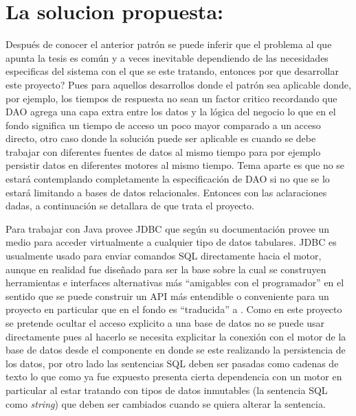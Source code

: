 \section{La solucion propuesta: \jj}
Después de conocer el anterior patrón se puede inferir que el problema al que apunta la tesis es común y a veces inevitable dependiendo de las necesidades especificas del sistema con el que se este tratando, entonces por que desarrollar este proyecto? Pues para aquellos desarrollos donde el patrón sea aplicable donde, por ejemplo, los tiempos de respuesta no sean un factor critico recordando que DAO agrega una capa extra entre los datos y la lógica del negocio lo que en el fondo significa un tiempo de acceso un poco mayor comparado a un acceso directo, otro caso donde la solución puede ser aplicable es cuando se debe trabajar con diferentes fuentes de datos al mismo tiempo para por ejemplo persistir datos en diferentes motores al mismo tiempo. Tema aparte es que no se estará contemplando completamente la especificación de DAO si no que se lo estará limitando a bases de datos relacionales. Entonces con las aclaraciones dadas, a continuación se detallara de que trata el proyecto.

Para trabajar con \dd Java provee JDBC\cite{java:jdbc} que según su documentación provee un medio para acceder virtualmente a cualquier tipo de datos tabulares. JDBC es usualmente usado para enviar comandos SQL directamente hacia el motor, aunque en realidad fue diseñado para ser la base sobre la cual se construyen herramientas e interfaces alternativas más ``amigables con el programador'' en el sentido que se puede construir un API más entendible o conveniente para un proyecto en particular que en el fondo es ``traducida'' a \jd. Como en este proyecto se pretende ocultar el acceso explicito a una base de datos no se puede usar directamente \jd pues al hacerlo se necesita explicitar la conexión con el motor de la base de datos desde el componente en donde se este realizando la persistencia de los datos, por otro lado las sentencias SQL deben ser pasadas como cadenas de texto lo que como ya fue expuesto presenta cierta dependencia con un motor en particular al estar tratando con tipos de datos inmutables (la sentencia SQL como \textit{string}) que deben ser cambiados cuando se quiera alterar la sentencia.

